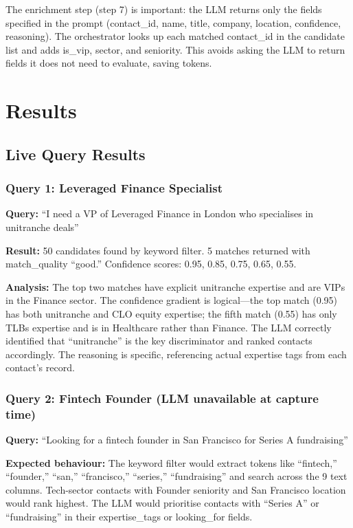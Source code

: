 \documentclass[12pt, a4paper]{report}
\begin{document}
The enrichment step (step 7) is important: the LLM returns only the fields specified in the prompt (contact\_id, name, title, company, location, confidence, reasoning). The orchestrator looks up each matched contact\_id in the candidate list and adds is\_vip, sector, and seniority. This avoids asking the LLM to return fields it does not need to evaluate, saving tokens.

\chapter{Results}

\section{Live Query Results}

\subsection{Query 1: Leveraged Finance Specialist}

\textbf{Query:} ``I need a VP of Leveraged Finance in London who specialises in unitranche deals''

\textbf{Result:} 50 candidates found by keyword filter. 5 matches returned with match\_quality ``good.'' Confidence scores: 0.95, 0.85, 0.75, 0.65, 0.55.

\textbf{Analysis:} The top two matches have explicit unitranche expertise and are VIPs in the Finance sector. The confidence gradient is logical---the top match (0.95) has both unitranche and CLO equity expertise; the fifth match (0.55) has only TLBs expertise and is in Healthcare rather than Finance. The LLM correctly identified that ``unitranche'' is the key discriminator and ranked contacts accordingly. The reasoning is specific, referencing actual expertise tags from each contact's record.

\subsection{Query 2: Fintech Founder (LLM unavailable at capture time)}

\textbf{Query:} ``Looking for a fintech founder in San Francisco for Series A fundraising''

\textbf{Expected behaviour:} The keyword filter would extract tokens like ``fintech,'' ``founder,'' ``san,'' ``francisco,'' ``series,'' ``fundraising'' and search across the 9 text columns. Tech-sector contacts with Founder seniority and San Francisco location would rank highest. The LLM would prioritise contacts with ``Series A'' or ``fundraising'' in their expertise\_tags or looking\_for fields.
\end{document}
